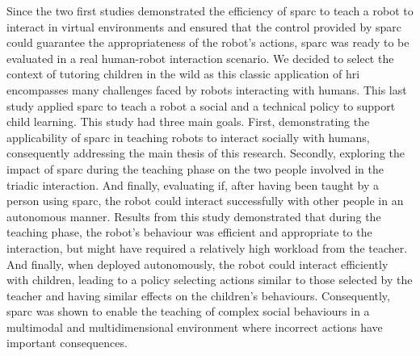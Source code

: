 Since the two first studies demonstrated the efficiency of \gls{sparc} to teach a robot to interact in virtual environments and ensured that the control provided by \gls{sparc} could guarantee the appropriateness of the robot's actions, \gls{sparc} was ready to be evaluated in a real human-robot interaction scenario. We decided to select the context of tutoring children in the wild as this classic application of \gls{hri} encompasses many challenges faced by robots interacting with humans. This last study applied \gls{sparc} to teach a robot a social and a technical policy to support child learning. This study had three main goals. First, demonstrating the applicability of \gls{sparc} in teaching robots to interact socially with humans, consequently addressing the main thesis of this research. Secondly, exploring the impact of \gls{sparc} during the teaching phase on the two people involved in the triadic interaction. And finally, evaluating if, after having been taught by a person using \gls{sparc}, the robot could interact successfully with other people in an autonomous manner. Results from this study demonstrated that during the teaching phase, the robot's behaviour was efficient and appropriate to the interaction, but might have required a relatively high workload from the teacher. And finally, when deployed autonomously, the robot could interact efficiently with children, leading to a policy selecting actions similar to those selected by the teacher and having similar effects on the children's behaviours. Consequently, \gls{sparc} was shown to enable the teaching of complex social behaviours in a multimodal and multidimensional environment where incorrect actions have important consequences.

